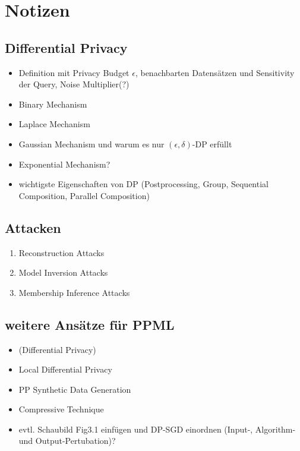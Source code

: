 \chapter{Notizen}

\section{Differential Privacy}

\begin{itemize}
  \item Definition mit Privacy Budget $\epsilon$, benachbarten Datensätzen und Sensitivity der Query, Noise Multiplier(?)
  \item Binary Mechanism
  \item Laplace Mechanism
  \item Gaussian Mechanism und warum es nur $(\epsilon, \delta)$-DP erfüllt
  \item Exponential Mechanism?
  \item wichtigste Eigenschaften von DP (Postprocessing, Group, Sequential Composition, Parallel Composition)
\end{itemize}

\section{Attacken}

\begin{enumerate}
  \item Reconstruction Attacks
  \item Model Inversion Attacks
  \item Membership Inference Attacks
\end{enumerate}

\section{weitere Ansätze für PPML}

\begin{itemize}
  \item (Differential Privacy)
  \item Local Differential Privacy
  \item PP Synthetic Data Generation
  \item Compressive Technique
  \item evtl. Schaubild Fig3.1 einfügen und DP-SGD einordnen (Input-, Algorithm- und Output-Pertubation)?
\end{itemize}
